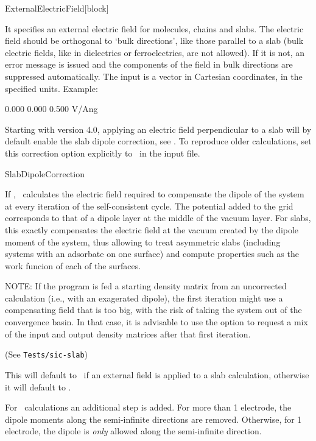 \begin{fdfentry}{ExternalElectricField}[block]
  
  It specifies an external electric field for molecules, chains and
  slabs.  The electric field should be orthogonal to `bulk
  directions', like those parallel to a slab (bulk electric fields,
  like in dielectrics or ferroelectrics, are not allowed). If it is
  not, an error message is issued and the components of the field in
  bulk directions are suppressed automatically. The input is a vector
  in Cartesian coordinates, in the specified units. Example:
  \begin{fdfexample}
        0.000  0.000  0.500  V/Ang
  \end{fdfexample}

  Starting with version 4.0, applying an electric field perpendicular
  to a slab will by default enable the slab dipole correction, see
  . To reproduce older calculations, set
  this correction option explicitly to \fdffalse\ in the input file.

\end{fdfentry}

\begin{fdflogicalF}{SlabDipoleCorrection}
  
  If \fdftrue, \siesta\ calculates the electric field required to
  compensate the dipole of the system at every iteration of the
  self-consistent cycle. The potential added to the grid corresponds
  to that of a dipole layer at the middle of the vacuum layer. For
  slabs, this exactly compensates the electric field at the vacuum
  created by the dipole moment of the system, thus allowing to treat
  asymmetric slabs (including systems with an adsorbate on one
  surface) and compute properties such as the work funcion of each of
  the surfaces.

  NOTE: If the program is fed a starting density matrix from an
  uncorrected calculation (i.e., with an exagerated dipole), the first
  iteration might use a compensating field that is too big, with the
  risk of taking the system out of the convergence basin. In that
  case, it is advisable to use the
   option to request a mix of the input and
  output density matrices after that first iteration.

  (See \texttt{Tests/sic-slab})

  This will default to \fdftrue\ if an external field is applied to a
  slab calculation, otherwise it will default to \fdffalse.

  For \tsiesta\ calculations an additional step is added. For more
  than 1 electrode, the dipole moments along the semi-infinite
  directions are removed. Otherwise, for 1 electrode, the dipole is
  \emph{only} allowed along the semi-infinite direction.

\end{fdflogicalF}


